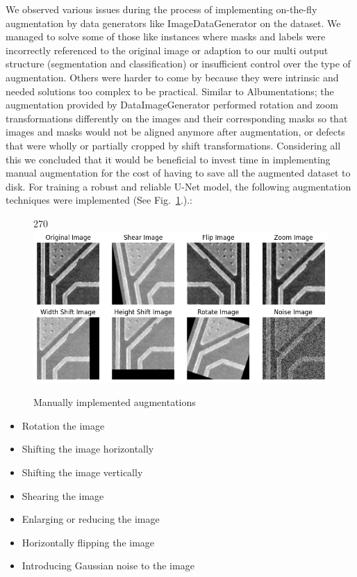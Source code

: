 \documentclass[12pt]{article}
\begin{document}
We observed various issues during the process of implementing on-the-fly augmentation by data generators like ImageDataGenerator on the dataset. We managed to solve some of those like instances where masks and labels were incorrectly referenced to the original image or adaption to our multi output structure (segmentation and classification) or insufficient control over the type of augmentation.  Others were harder to come by because they were intrinsic and needed solutions too complex to be practical. Similar to Albumentations; the  augmentation provided by DataImageGenerator performed rotation and zoom transformations differently on the images and their corresponding masks so that images and masks would not be aligned anymore after augmentation, or defects that were wholly or partially cropped by shift transformations. Considering all this we concluded that it would be beneficial to invest time in implementing manual augmentation for the cost of having to save all the augmented dataset to disk. For training a robust and reliable U-Net model, the following augmentation techniques were implemented (See Fig.~\ref{fig:manual_augmentation}.).:
\begin{figure}[h]
    \centering
    \begin{turn}{270}
    \includegraphics[width=1\textwidth]{./graphics/manual augmentation.png}
    \end{turn}
    \caption{Manually implemented augmentations}
    \label{fig:manual_augmentation}
\end{figure}

\begin{itemize}
    \item Rotation the image 
    \item Shifting the image horizontally  
    \item Shifting the image vertically  
    \item Shearing the image
    \item Enlarging or reducing  the image
    \item Horizontally flipping the image 
    \item Introducing Gaussian noise to the image
\end{itemize}
\end{document}
